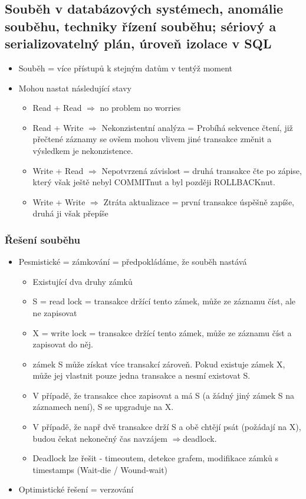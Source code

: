 \documentclass[10pt,a4paper]{article}
\begin{document}
\subsection{Souběh v databázových systémech, anomálie souběhu, techniky řízení souběhu; sériový a serializovatelný plán, úroveň izolace v SQL}

\begin{itemize}
\item Souběh = více přístupů k stejným datům v tentýž moment
\item Mohou nastat následující stavy
\begin{itemize}
\item Read + Read $\Rightarrow$ no problem no worries
\item Read + Write $\Rightarrow$ Nekonzistentní analýza = Probíhá sekvence čtení, již přečtené záznamy se ovšem mohou vlivem jiné transakce změnit a výsledkem je nekonzistence.
\item Write + Read $\Rightarrow$ Nepotvrzená závislost = druhá transakce čte po zápise, který však ještě nebyl COMMITnut a byl později ROLLBACKnut.
\item Write + Write $\Rightarrow$ Ztráta aktualizace = první transakce úspěšně zapíše, druhá ji však přepíše
\end{itemize}
\end{itemize}

\subsubsection{Řešení souběhu}

\begin{itemize}
\item Pesmistické = zámkování = předpokládáme, že souběh nastává
\begin{itemize}
\item Existující dva druhy zámků
\item S = read lock = transakce držící tento zámek, může ze záznamu číst, ale ne zapisovat
\item X = write lock = transakce držící tento zámek, může ze záznamu číst a zapisovat do něj.
\item zámek S může získat více transakcí zároveň. Pokud existuje zámek X, může jej vlastnit pouze jedna transakce a nesmí existovat S.
\item V případě, že transakce chce zapisovat a má S (a žádný jiný zámek S na záznamech není), S se upgraduje na X.
\item V případě, že např dvě transakce drží S a obě chtějí psát (požádají na X), budou čekat nekonečný čas navzájem $\Rightarrow$deadlock.
\item Deadlock lze řešit - timeoutem, detekce grafem, modifikace zámků s timestamps (Wait-die / Wound-wait)
\end{itemize}
\item Optimistické řešení = verzování
\end{itemize}
\end{document}
